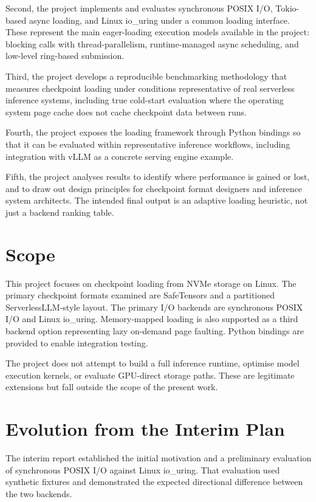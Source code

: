 Second, the project implements and evaluates synchronous POSIX I/O, Tokio-based async loading, and Linux io\_uring under a common loading interface. These represent the main eager-loading execution models available in the project: blocking calls with thread-parallelism, runtime-managed async scheduling, and low-level ring-based submission.

Third, the project develops a reproducible benchmarking methodology that measures checkpoint loading under conditions representative of real serverless inference systems, including true cold-start evaluation where the operating system page cache does not cache checkpoint data between runs.

Fourth, the project exposes the loading framework through Python bindings so that it can be evaluated within representative inference workflows, including integration with vLLM as a concrete serving engine example.

Fifth, the project analyses results to identify where performance is gained or lost, and to draw out design principles for checkpoint format designers and inference system architects. The intended final output is an adaptive loading heuristic, not just a backend ranking table.

\section{Scope}

This project focuses on checkpoint loading from NVMe storage on Linux. The primary checkpoint formats examined are SafeTensors and a partitioned ServerlessLLM-style layout. The primary I/O backends are synchronous POSIX I/O and Linux io\_uring. Memory-mapped loading is also supported as a third backend option representing lazy on-demand page faulting. Python bindings are provided to enable integration testing.

The project does not attempt to build a full inference runtime, optimise model execution kernels, or evaluate GPU-direct storage paths. These are legitimate extensions but fall outside the scope of the present work.

\section{Evolution from the Interim Plan}

The interim report established the initial motivation and a preliminary evaluation of synchronous POSIX I/O against Linux io\_uring. That evaluation used synthetic fixtures and demonstrated the expected directional difference between the two backends.

